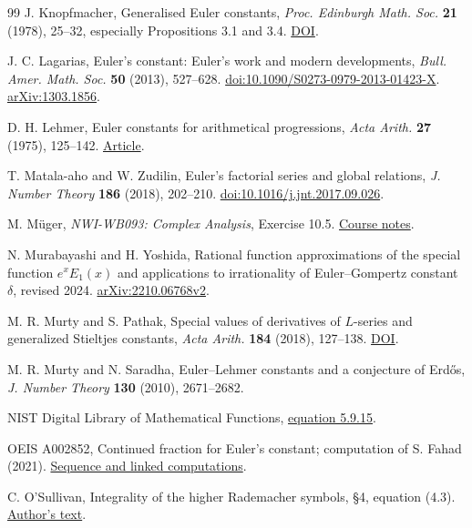 \documentclass[11pt,a4paper,oneside,openany]{report}
\theoremstyle{remark}\newtheorem{remark}[theorem]{Remark}
\numberwithin{equation}{section}
\begin{document}
\begin{thebibliography}{99}
 J. Knopfmacher, Generalised Euler constants, \emph{Proc. Edinburgh Math. Soc.} \textbf{21} (1978), 25--32, especially Propositions 3.1 and 3.4. \href{https://doi.org/10.1017/S0013091500015844}{DOI}.

 J. C. Lagarias, Euler's constant: Euler's work and modern developments, \emph{Bull. Amer. Math. Soc.} \textbf{50} (2013), 527--628. \href{https://doi.org/10.1090/S0273-0979-2013-01423-X}{doi:10.1090/S0273-0979-2013-01423-X}. \href{https://arxiv.org/abs/1303.1856}{arXiv:1303.1856}.

 D. H. Lehmer, Euler constants for arithmetical progressions, \emph{Acta Arith.} \textbf{27} (1975), 125--142. \href{https://matwbn.icm.edu.pl/ksiazki/aa/aa27/aa27121.pdf}{Article}.

 T. Matala-aho and W. Zudilin, Euler's factorial series and global relations, \emph{J. Number Theory} \textbf{186} (2018), 202--210. \href{https://doi.org/10.1016/j.jnt.2017.09.026}{doi:10.1016/j.jnt.2017.09.026}.

 M. M\"uger, \emph{NWI-WB093: Complex Analysis}, Exercise 10.5. \href{https://www.math.ru.nl/~mueger/CA-notes.pdf}{Course notes}.

 N. Murabayashi and H. Yoshida, Rational function approximations of the special function $e^xE_1(x)$ and applications to irrationality of Euler--Gompertz constant $\delta$, revised 2024. \href{https://arxiv.org/abs/2210.06768v2}{arXiv:2210.06768v2}.

 M. R. Murty and S. Pathak, Special values of derivatives of $L$-series and generalized Stieltjes constants, \emph{Acta Arith.} \textbf{184} (2018), 127--138. \href{https://doi.org/10.4064/aa170615-13-3}{DOI}.

 M. R. Murty and N. Saradha, Euler--Lehmer constants and a conjecture of Erd\H os, \emph{J. Number Theory} \textbf{130} (2010), 2671--2682.

 NIST Digital Library of Mathematical Functions, \href{https://dlmf.nist.gov/5.9.E15}{equation 5.9.15}.

 OEIS A002852, Continued fraction for Euler's constant; computation of S. Fahad (2021). \href{https://oeis.org/A002852}{Sequence and linked computations}.

 C. O'Sullivan, Integrality of the higher Rademacher symbols, \S4, equation (4.3). \href{https://fsw01.bcc.cuny.edu/cormac.osullivan/Research/symbol-integrality-revised.pdf}{Author's text}.


\end{thebibliography}
\end{document}
